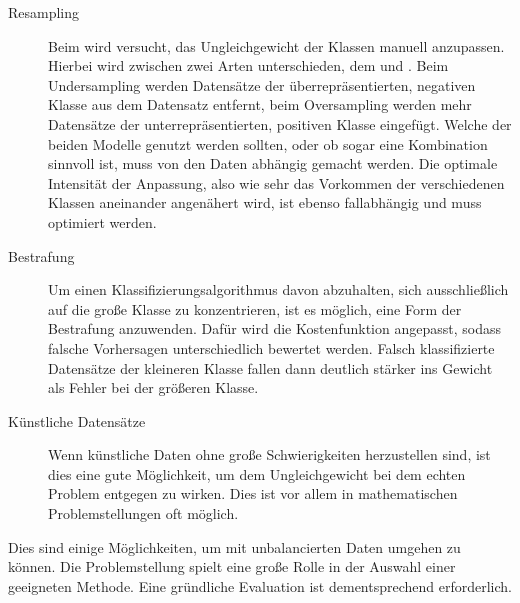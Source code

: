 \begin{description}

    \item[Resampling] \citep{resampling}
    Beim  wird versucht, das Ungleichgewicht der Klassen manuell anzupassen. Hierbei wird zwischen zwei Arten unterschieden, dem  und . Beim Undersampling werden Datensätze der überrepräsentierten, negativen Klasse aus dem Datensatz entfernt, beim Oversampling werden mehr Datensätze der unterrepräsentierten, positiven Klasse eingefügt. Welche der beiden Modelle genutzt werden sollten, oder ob sogar eine Kombination sinnvoll ist, muss von den Daten abhängig gemacht werden. Die optimale Intensität der Anpassung, also wie sehr das Vorkommen der verschiedenen Klassen aneinander angenähert wird, ist ebenso fallabhängig und muss optimiert werden.

    \item[Bestrafung]
    Um einen Klassifizierungsalgorithmus davon abzuhalten, sich ausschließlich auf die große Klasse zu konzentrieren, ist es möglich, eine Form der Bestrafung anzuwenden. Dafür wird die Kostenfunktion angepasst, sodass falsche Vorhersagen unterschiedlich bewertet werden. Falsch klassifizierte Datensätze der kleineren Klasse fallen dann deutlich stärker ins Gewicht als Fehler bei der größeren Klasse.

    \item[Künstliche Datensätze]
    Wenn künstliche Daten ohne große Schwierigkeiten herzustellen sind, ist dies eine gute Möglichkeit, um dem Ungleichgewicht bei dem echten Problem entgegen zu wirken. Dies ist vor allem in mathematischen Problemstellungen oft möglich.
\end{description}

Dies sind einige Möglichkeiten, um mit unbalancierten Daten umgehen zu können. Die Problemstellung spielt eine große Rolle in der Auswahl einer geeigneten Methode. Eine gründliche Evaluation ist dementsprechend erforderlich.



